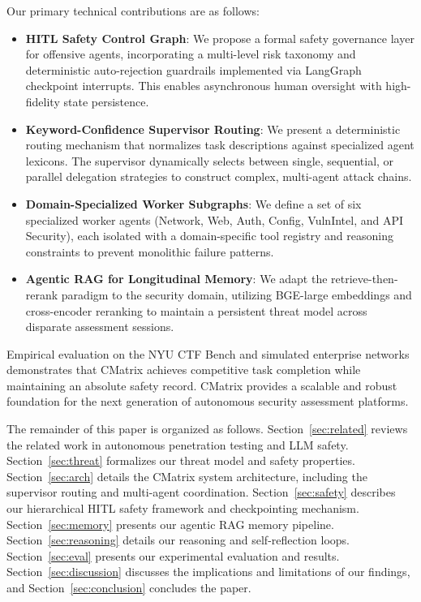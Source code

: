 \documentclass[conference,compsoc]{IEEEtran}
\begin{document}
Our primary technical contributions are as follows:
\begin{itemize}
    \item \textbf{HITL Safety Control Graph}: We propose a formal safety governance layer for offensive agents, incorporating a multi-level risk taxonomy and deterministic auto-rejection guardrails implemented via LangGraph checkpoint interrupts. This enables asynchronous human oversight with high-fidelity state persistence.
    
    \item \textbf{Keyword-Confidence Supervisor Routing}: We present a deterministic routing mechanism that normalizes task descriptions against specialized agent lexicons. The supervisor dynamically selects between single, sequential, or parallel delegation strategies to construct complex, multi-agent attack chains.

    \item \textbf{Domain-Specialized Worker Subgraphs}: We define a set of six specialized worker agents (Network, Web, Auth, Config, VulnIntel, and API Security), each isolated with a domain-specific tool registry and reasoning constraints to prevent monolithic failure patterns.

    \item \textbf{Agentic RAG for Longitudinal Memory}: We adapt the retrieve-then-rerank paradigm to the security domain, utilizing BGE-large embeddings and cross-encoder reranking to maintain a persistent threat model across disparate assessment sessions.
\end{itemize}

Empirical evaluation on the NYU CTF Bench and simulated enterprise networks demonstrates that CMatrix achieves competitive task completion while maintaining an absolute safety record. CMatrix provides a scalable and robust foundation for the next generation of autonomous security assessment platforms.

The remainder of this paper is organized as follows. Section~\ref{sec:related} reviews the related work in autonomous penetration testing and LLM safety. Section~\ref{sec:threat} formalizes our threat model and safety properties. Section~\ref{sec:arch} details the CMatrix system architecture, including the supervisor routing and multi-agent coordination. Section~\ref{sec:safety} describes our hierarchical HITL safety framework and checkpointing mechanism. Section~\ref{sec:memory} presents our agentic RAG memory pipeline. Section~\ref{sec:reasoning} details our reasoning and self-reflection loops. Section~\ref{sec:eval} presents our experimental evaluation and results. Section~\ref{sec:discussion} discusses the implications and limitations of our findings, and Section~\ref{sec:conclusion} concludes the paper.
\end{document}

